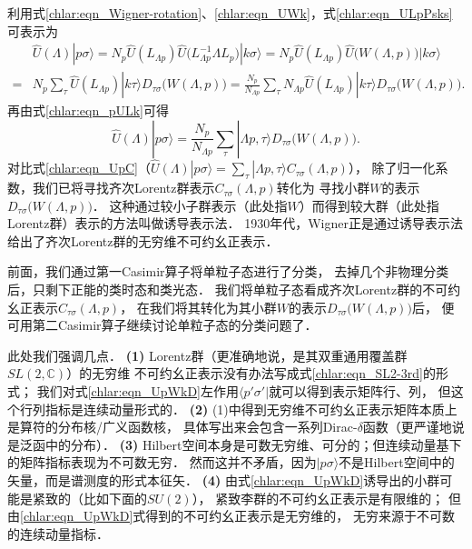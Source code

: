 利用式\eqref{chlar:eqn_Wigner-rotation}、\eqref{chlar:eqn_UWk}，式\eqref{chlar:eqn_ULpPsks}可表示为
\begin{align*}
	&\hat{U}(\Lambda) |p\sigma\rangle =
	N_p \hat{U}(L_{\Lambda p}) \hat{U}\bigl(L^{-1}_{\Lambda p}\Lambda L_p\bigr) |k\sigma\rangle 
	=N_p \hat{U}(L_{\Lambda p}) \hat{U}\bigl(W(\Lambda,p)\bigr) |k\sigma\rangle  \\
	=& N_p \sum_{\tau} \hat{U}(L_{\Lambda p}) |k\tau \rangle D_{\tau\sigma} \bigl(W(\Lambda,p)\bigr)  
	=	\frac{N_p}{N_{\Lambda p}} \sum_{\tau} N_{\Lambda p}\hat{U}(L_{\Lambda p}) 
	|k\tau \rangle D_{\tau\sigma} \bigl(W(\Lambda,p)\bigr) .
\end{align*}
再由式\eqref{chlar:eqn_pULk}可得
\begin{equation}\label{chlar:eqn_UpWkD}
	\hat{U}(\Lambda) |p\sigma\rangle = \frac{N_p}{N_{\Lambda p}} \sum_{\tau} 
	|\Lambda p, \tau \rangle D_{\tau\sigma} \bigl(W(\Lambda,p)\bigr) .
\end{equation}
对比式\eqref{chlar:eqn_UpC}（$\hat{U}(\Lambda) |p\sigma\rangle = 
\sum_{\tau} |\Lambda p,\tau \rangle C_{\tau\sigma}(\Lambda,p)$），
除了归一化系数，我们已将寻找齐次Lorentz群表示$C_{\tau\sigma}(\Lambda,p)$转化为
寻找小群$W$的表示$D_{\tau\sigma} \bigl(W(\Lambda,p)\bigr)$．
这种通过较小子群表示（此处指$W$）而得到较大群（此处指Lorentz群）表示的方法叫做{\kaishu 诱导表示法}．
1930年代，Wigner正是通过诱导表示法给出了齐次Lorentz群的无穷维不可约幺正表示．


前面，我们通过第一Casimir算子将单粒子态进行了分类，
去掉几个非物理分类后，只剩下正能的{\kaishu 类时态}和{\kaishu 类光态}．
我们将单粒子态看成齐次Lorentz群的不可约幺正表示$C_{\tau\sigma}(\Lambda,p)$，
在我们将其转化为其小群$W$的表示$D_{\tau\sigma} \bigl(W(\Lambda,p)\bigr)$后，
便可用第二Casimir算子继续讨论单粒子态的分类问题了．


\begin{remark}
	此处我们强调几点．
	{\bfseries (1)} Lorentz群（更准确地说，是其双重通用覆盖群$SL(2,\mathbb{C})$）的无穷维
	不可约幺正表示没有办法写成式\eqref{chlar:eqn_SL2-3rd}的形式；
	我们对式\eqref{chlar:eqn_UpWkD}左作用$\langle p' \sigma' |$就可以得到表示矩阵行、列，
	但这个行列指标是连续动量形式的．
	{\bfseries (2)} (1)中得到无穷维不可约幺正表示矩阵本质上是算符的分布核/广义函数核，
	具体写出来会包含一系列Dirac-$\delta$函数（更严谨地说是泛函中的分布）．
	{\bfseries (3)} Hilbert空间本身是可数无穷维、可分的；但连续动量基下的矩阵指标表现为不可数无穷．
	然而这并不矛盾，因为$|p\sigma\rangle$不是Hilbert空间中的矢量，而是谱测度的形式本征矢．
	{\bfseries (4)} 由式\eqref{chlar:eqn_UpWkD}诱导出的小群可能是紧致的（比如下面的$SU(2)$），
	紧致李群的不可约幺正表示是有限维的；
	但由\eqref{chlar:eqn_UpWkD}式得到的不可约幺正表示是无穷维的，
	无穷来源于不可数的连续动量指标．
\end{remark}


